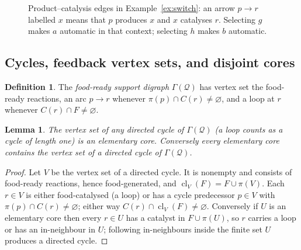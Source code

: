 \documentclass[11pt,a4paper]{article}
\theoremstyle{plain}
\newtheorem{lemma}[theorem]{Lemma}
\theoremstyle{definition}
\newtheorem{definition}[theorem]{Definition}
\theoremstyle{remark}
\newcommand{\QQ}{\mathcal Q}
\newcommand{\cl}{\operatorname{cl}}
\begin{document}
\begin{figure}[tb]\centering
{}
\caption{Product--catalysis edges in Example~\ref{ex:switch}: an arrow $p\to r$ labelled $x$ means that $p$ produces $x$ and $x$ catalyses $r$. Selecting $g$ makes $a$ automatic in that context; selecting $h$ makes $b$ automatic.}
\label{fig:contexts}
\end{figure}

\subsection{Cycles, feedback vertex sets, and disjoint cores}

\begin{definition}\label{def:support-digraph}
The \emph{food-ready support digraph} $\Gamma(\QQ)$ has vertex set the food-ready reactions,
an arc $p\to r$ whenever $\pi(p)\cap C(r)\neq\varnothing$, and a loop at $r$ whenever
$C(r)\cap F\neq\varnothing$.
\end{definition}

\begin{lemma}\label{lem:cycle-core}
The vertex set of any directed cycle of $\Gamma(\QQ)$ (a loop counts as a cycle of length
one) is an elementary core. Conversely every elementary core contains the vertex set of a
directed cycle of $\Gamma(\QQ)$.
\end{lemma}
\begin{proof}
Let $V$ be the vertex set of a directed cycle. It is nonempty and consists of food-ready
reactions, hence food-generated, and $\cl_V(F)=F\cup\pi(V)$. Each $r\in V$ is either
food-catalysed (a loop) or has a cycle predecessor $p\in V$ with $\pi(p)\cap C(r)\neq\varnothing$;
either way $C(r)\cap\cl_V(F)\neq\varnothing$. Conversely if $U$ is an elementary core then
every $r\in U$ has a catalyst in $F\cup\pi(U)$, so $r$ carries a loop or has an in-neighbour
in $U$; following in-neighbours inside the finite set $U$ produces a directed cycle.
\end{proof}
\end{document}
